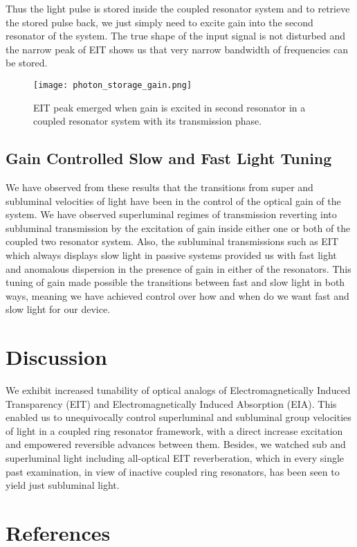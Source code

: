 Thus the light pulse is stored inside the coupled resonator system and to retrieve the stored pulse back, we just simply need to excite gain into the second resonator of the system. The true shape of the input signal is not disturbed and the narrow peak of EIT shows us that very narrow bandwidth of frequencies can be stored.

\begin{figure}[h]
\centering 
\texttt{[image: photon\_storage\_gain.png]}
\caption{EIT peak emerged when gain is excited in second resonator in a coupled resonator system with its transmission phase.}
\end{figure}

\subsection{Gain Controlled Slow and Fast Light Tuning}
We have observed from these results that the transitions from super and subluminal velocities of light have been in the control of the optical gain of the system. We have observed superluminal regimes of transmission reverting into subluminal transmission by the excitation of gain inside either one or both of the coupled two resonator system. Also, the subluminal transmissions such as EIT which always displays slow light in passive systems provided us with fast light and anomalous dispersion in the presence of gain in either of the resonators. This tuning of gain made possible the transitions between fast and slow light in both ways, meaning we have achieved control over how and when do we want fast and slow light for our device.

\newpage
\section{Discussion}
We exhibit increased tunability of optical analogs of Electromagnetically Induced Transparency (EIT) and Electromagnetically Induced Absorption (EIA). This enabled us to unequivocally control superluminal and subluminal group velocities of light in a coupled ring resonator framework, with a direct increase excitation and empowered reversible advances between them. Besides, we watched sub and superluminal light including all-optical EIT reverberation, which in every single past examination, in view of inactive coupled ring resonators, has been seen to yield just subluminal light.


\newpage
\section*{References}

